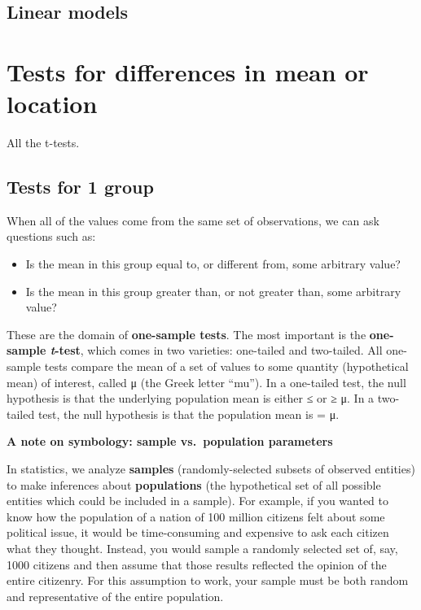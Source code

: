 \documentclass[
  13,
  letterpaper,
]{report}
\begin{document}
\section{Linear models}\label{sec-review-lin}

\chapter{Tests for differences in mean or location}\label{sec-groups}

All the t-tests.

\section{Tests for 1 group}\label{sec-groups-1samp}

When all of the values come from the same set of observations, we can
ask questions such as:

\begin{itemize}
\item
  Is the mean in this group equal to, or different from, some arbitrary
  value?
\item
  Is the mean in this group greater than, or not greater than, some
  arbitrary value?
\end{itemize}

These are the domain of \textbf{one-sample tests}. The most important is
the \textbf{one-sample \emph{t}-test}, which comes in two varieties:
one-tailed and two-tailed. All one-sample tests compare the mean of a
set of values to some quantity (hypothetical mean) of interest, called μ
(the Greek letter ``mu''). In a one-tailed test, the null hypothesis is
that the underlying population mean is either ≤ or ≥ μ. In a two-tailed
test, the null hypothesis is that the population mean is = μ.

\textbf{A note on symbology: sample vs.~population parameters}

In statistics, we analyze \textbf{samples} (randomly-selected subsets of
observed entities) to make inferences about \textbf{populations} (the
hypothetical set of all possible entities which could be included in a
sample). For example, if you wanted to know how the population of a
nation of 100 million citizens felt about some political issue, it would
be time-consuming and expensive to ask each citizen what they thought.
Instead, you would sample a randomly selected set of, say, 1000 citizens
and then assume that those results reflected the opinion of the entire
citizenry. For this assumption to work, your sample must be both random
and representative of the entire population.
\end{document}
